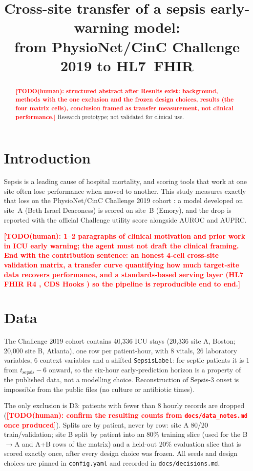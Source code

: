\documentclass[11pt,a4paper]{article}
\title{Cross-site transfer of a sepsis early-warning model:\\
from PhysioNet/CinC Challenge 2019 to HL7~FHIR}
\author{%
  \todohuman{author list, order, affiliations}%
}
\date{\todohuman{date}}
\newcommand{\todohuman}[1]{\textcolor{red}{\textbf{[TODO(human): #1]}}}
\begin{document}
\maketitle

\begin{abstract}
\todohuman{structured abstract after Results exist: background, methods with
the one exclusion and the frozen design choices, results (the four matrix
cells), conclusion framed as transfer measurement, not clinical performance.}
Research prototype; not validated for clinical use.
\end{abstract}

\section{Introduction}
Sepsis is a leading cause of hospital mortality, and scoring tools that work at
one site often lose performance when moved to another. This study measures
exactly that loss on the PhysioNet/CinC Challenge 2019 cohort
\citep{reyna2019}: a model developed on site~A (Beth Israel Deaconess) is
scored on site~B (Emory), and the drop is reported with the official Challenge
utility score \citep{reyna2019} alongside AUROC and AUPRC.

\todohuman{1--2 paragraphs of clinical motivation and prior work in ICU early
warning; the agent must not draft the clinical framing. End with the
contribution sentence: an honest 4-cell cross-site validation matrix, a
transfer curve quantifying how much target-site data recovers performance, and
a standards-based serving layer (HL7 FHIR R4 \citep{fhirr4}, CDS Hooks
\citep{cdshooks}) so the pipeline is reproducible end to end.}

\section{Data}
The Challenge 2019 cohort \citep{reyna2019} contains 40{,}336 ICU stays
(20{,}336 site A, Boston; 20{,}000 site B, Atlanta), one row per patient-hour,
with 8 vitals, 26 laboratory variables, 6 context variables and a shifted
\texttt{SepsisLabel}: for septic patients it is 1 from $t_{\text{sepsis}}-6$
onward, so the six-hour early-prediction horizon is a property of the published
data, not a modelling choice. Reconstruction of Sepsis-3 onset
\citep{sepsis3} is impossible from the public files (no culture or antibiotic
times).

The only exclusion is D3: patients with fewer than 8 hourly records are dropped
(\todohuman{confirm the resulting counts from \texttt{docs/data\_notes.md} once
produced}). Splits are by patient, never by row: site A 80/20 train/validation;
site B split by patient into an 80\% training slice (used for the B$\to$A and
A+B rows of the matrix) and a held-out 20\% evaluation slice that is scored
exactly once, after every design choice was frozen. All seeds and design
choices are pinned in \texttt{config.yaml} and recorded in
\texttt{docs/decisions.md}.
\end{document}
